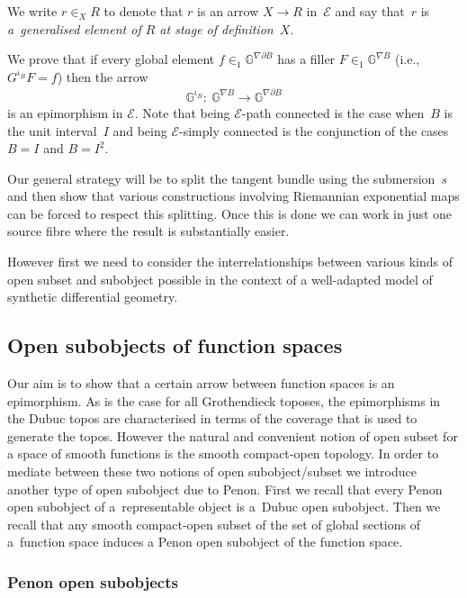 \documentclass[pdftex]{sigma}
\numberwithin{equation}{section}
\begin{document}
\begin{Notation} We write $r\in_{X}R$ to denote that $r$ is an arrow $X\rightarrow R$ in~$\mathcal{E}$ and say that~$r$ is \emph{a~generalised element of $R$ at stage of definition~$X$}.
\end{Notation}

We prove that if every global element $f\in_1 \mathbb{G}^{\nabla\partial B}$ has a f\/iller $F\in_1 \mathbb{G}^{\nabla B}$ (i.e., $G^{\iota_B}F=f$) then the arrow
\begin{gather*}\mathbb{G}^{\iota_B}\colon \ \mathbb{G}^{\nabla B} \rightarrow \mathbb{G}^{\nabla\partial B}\end{gather*}
is an epimorphism in $\mathcal{E}$. Note that being $\mathcal{E}$-path connected is the case when~$B$ is the unit interval~$I$ and being $\mathcal{E}$-simply connected is the conjunction of the cases $B=I$ and $B=I^2$.

Our general strategy will be to split the tangent bundle using the submersion~$s$ and then show that various constructions involving Riemannian exponential maps can be forced to respect this splitting. Once this is done we can work in just one source f\/ibre where the result is substantially easier.

However f\/irst we need to consider the interrelationships between various kinds of open subset and subobject possible in the context of a well-adapted model of synthetic dif\/ferential geometry.

\subsection{Open subobjects of function spaces}

Our aim is to show that a certain arrow between function spaces is an epimorphism. As is the case for all Grothendieck toposes, the epimorphisms in the Dubuc topos are characterised in terms of the coverage that is used to generate the topos. However the natural and convenient notion of open subset for a space of smooth functions is the smooth compact-open topology. In order to mediate between these two notions of open subobject/subset we introduce another type of open subobject due to Penon. First we recall that every Penon open subobject of a~representable object is a~Dubuc open subobject. Then we recall that any smooth compact-open subset of the set of global sections of a~function space induces a Penon open subobject of the function space.

\subsubsection{Penon open subobjects}
\end{document}
